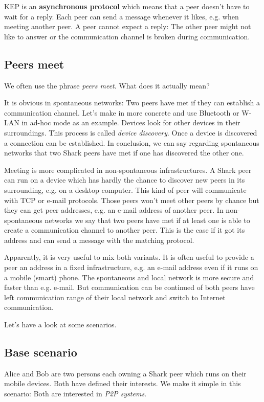 KEP is an {\bf asynchronous protocol} which means that a peer doesn't have to wait for a reply. Each peer can send a message whenever it likes, e.g. when meeting another peer. A peer cannot expect a reply: The other peer might not like to answer or the communication channel is broken during communication.

\subsection{Peers meet}
We often use the phrase {\it peers meet}. What does it actually mean?

It is obvious in spontaneous networks: Two peers have met if they can establish a communication channel. Let's make in more concrete and use Bluetooth or W-LAN in ad-hoc mode as an example. Devices look for other devices in their surroundings.
This process is called {\it device discovery}. Once a device is discovered a connection can be established. In conclusion, we can say regarding spontaneous networks that two Shark peers have met if one has discovered the other one.

Meeting is more complicated in non-spontaneous infrastructures. A Shark peer can run on a device which has hardly the chance to discover new peers in its surrounding, e.g. on a desktop computer. This kind of peer will communicate with TCP or e-mail protocols. Those peers won't meet other peers by chance but they can get peer addresses, e.g. an e-mail address of another peer. In non-spontaneous networks we say that two peers have met if at least one is able to create a communication channel to another peer. This is the case if it got its address and can send a message with the matching protocol.

Apparently, it is very useful to mix both variants. It is often useful to provide a peer an address in a fixed infrastructure, e.g. an e-mail address even if it runs on a mobile (smart) phone. The spontaneous and local network is more secure and faster than e.g. e-mail. But communication can be continued of both peers have left communication range of their local network and switch to Internet communication.

Let's have a look at some scenarios.

\subsection{Base scenario}
\label{sec:concepts:baseScenario}
Alice and Bob are two persons each owning a Shark peer which runs on their mobile devices. Both have defined their interests. We make it simple in this scenario:
Both are interested in {\it P2P systems}. 

